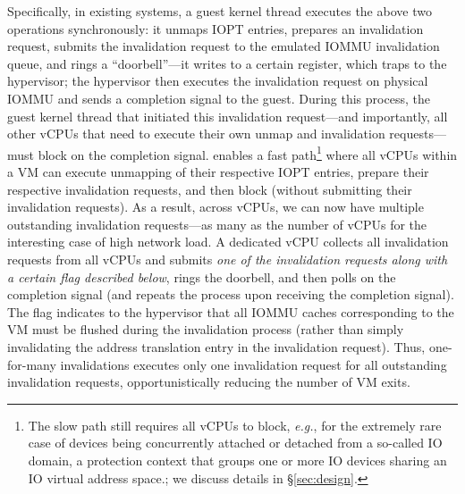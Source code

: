 Specifically, in existing systems, a guest kernel thread executes the above two operations synchronously: it unmaps IOPT entries, prepares an invalidation request, submits the invalidation request to the emulated IOMMU invalidation queue, and rings a ``doorbell''---it writes to a certain register, which traps to the hypervisor; the hypervisor then executes the invalidation request on physical IOMMU and sends a completion signal to the guest. During this process, the guest kernel thread that initiated this invalidation request---and importantly, all other vCPUs that need to execute their own unmap and invalidation requests---must block on the completion signal. {\name} enables a fast path{\footnote{The slow path still requires all vCPUs to block, \textit{e.g.}, for the extremely rare case of devices being concurrently attached or detached from a so-called IO domain, a protection context that groups one or more IO devices sharing an IO virtual address space.; we discuss details in \S\ref{sec:design}.}} where all vCPUs within a VM can execute unmapping of their respective IOPT entries, prepare their respective invalidation requests, and then block (without submitting their invalidation requests). As a result, across vCPUs, we can now have multiple outstanding invalidation requests---as many as the number of vCPUs for the interesting case of high network load. A dedicated vCPU collects all invalidation requests from all vCPUs and submits \textit{one of the invalidation requests along with a certain flag described below}, rings the doorbell, and then polls on the completion signal (and repeats the process upon receiving the completion signal). The flag indicates to the hypervisor that all IOMMU caches corresponding to the VM must be flushed during the invalidation process (rather than simply invalidating the address translation entry in the invalidation request). Thus, one-for-many invalidations executes only one invalidation request for all outstanding invalidation requests, opportunistically reducing the number of VM exits.  

